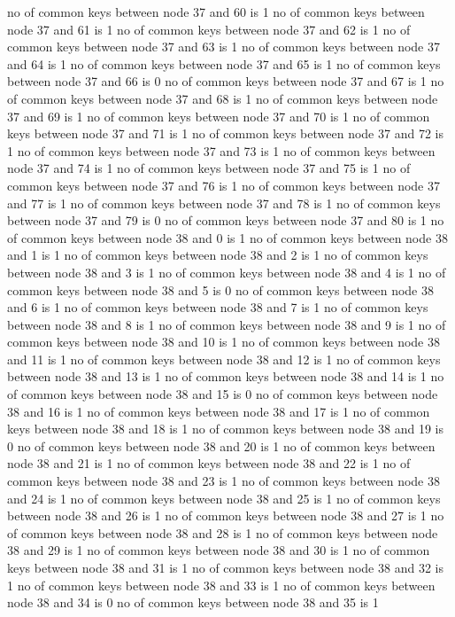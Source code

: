 no of common keys between node 37 and 60 is 1
no of common keys between node 37 and 61 is 1
no of common keys between node 37 and 62 is 1
no of common keys between node 37 and 63 is 1
no of common keys between node 37 and 64 is 1
no of common keys between node 37 and 65 is 1
no of common keys between node 37 and 66 is 0
no of common keys between node 37 and 67 is 1
no of common keys between node 37 and 68 is 1
no of common keys between node 37 and 69 is 1
no of common keys between node 37 and 70 is 1
no of common keys between node 37 and 71 is 1
no of common keys between node 37 and 72 is 1
no of common keys between node 37 and 73 is 1
no of common keys between node 37 and 74 is 1
no of common keys between node 37 and 75 is 1
no of common keys between node 37 and 76 is 1
no of common keys between node 37 and 77 is 1
no of common keys between node 37 and 78 is 1
no of common keys between node 37 and 79 is 0
no of common keys between node 37 and 80 is 1
no of common keys between node 38 and 0 is 1
no of common keys between node 38 and 1 is 1
no of common keys between node 38 and 2 is 1
no of common keys between node 38 and 3 is 1
no of common keys between node 38 and 4 is 1
no of common keys between node 38 and 5 is 0
no of common keys between node 38 and 6 is 1
no of common keys between node 38 and 7 is 1
no of common keys between node 38 and 8 is 1
no of common keys between node 38 and 9 is 1
no of common keys between node 38 and 10 is 1
no of common keys between node 38 and 11 is 1
no of common keys between node 38 and 12 is 1
no of common keys between node 38 and 13 is 1
no of common keys between node 38 and 14 is 1
no of common keys between node 38 and 15 is 0
no of common keys between node 38 and 16 is 1
no of common keys between node 38 and 17 is 1
no of common keys between node 38 and 18 is 1
no of common keys between node 38 and 19 is 0
no of common keys between node 38 and 20 is 1
no of common keys between node 38 and 21 is 1
no of common keys between node 38 and 22 is 1
no of common keys between node 38 and 23 is 1
no of common keys between node 38 and 24 is 1
no of common keys between node 38 and 25 is 1
no of common keys between node 38 and 26 is 1
no of common keys between node 38 and 27 is 1
no of common keys between node 38 and 28 is 1
no of common keys between node 38 and 29 is 1
no of common keys between node 38 and 30 is 1
no of common keys between node 38 and 31 is 1
no of common keys between node 38 and 32 is 1
no of common keys between node 38 and 33 is 1
no of common keys between node 38 and 34 is 0
no of common keys between node 38 and 35 is 1
